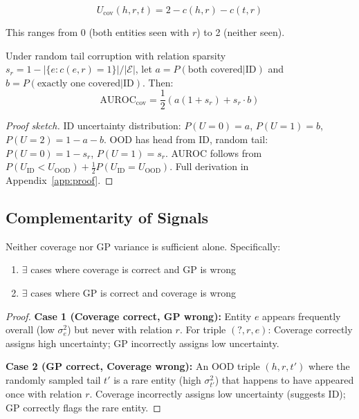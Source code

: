 \begin{definition}
\begin{equation}
    U_{\text{cov}}(h, r, t) = 2 - c(h, r) - c(t, r)
\end{equation}
\end{definition}

This ranges from 0 (both entities seen with $r$) to 2 (neither seen).

\begin{theorem}
\label{thm:coverage_auroc}
Under random tail corruption with relation sparsity $s_r = 1 - |\{e : c(e,r)=1\}|/|\mathcal{E}|$, let $a = P(\text{both covered} | \text{ID})$ and $b = P(\text{exactly one covered} | \text{ID})$. Then:
\begin{equation}
    \text{AUROC}_{\text{cov}} = \frac{1}{2}\left(a(1+s_r) + s_r \cdot b\right)
\end{equation}
\end{theorem}

\begin{proof}[Proof sketch]
ID uncertainty distribution: $P(U=0)=a$, $P(U=1)=b$, $P(U=2)=1-a-b$.
OOD has head from ID, random tail: $P(U=0)=1-s_r$, $P(U=1)=s_r$.
AUROC follows from $P(U_{\text{ID}} < U_{\text{OOD}}) + \frac{1}{2}P(U_{\text{ID}} = U_{\text{OOD}})$.
Full derivation in Appendix~\ref{app:proof}.
\end{proof}

\subsection{Complementarity of Signals}

\begin{theorem}[Complementarity]
\label{thm:complementarity}
Neither coverage nor GP variance is sufficient alone. Specifically:
\begin{enumerate}
    \item $\exists$ cases where coverage is correct and GP is wrong
    \item $\exists$ cases where GP is correct and coverage is wrong
\end{enumerate}
\end{theorem}

\begin{proof}
\textbf{Case 1 (Coverage correct, GP wrong):} Entity $e$ appears frequently overall (low $\sigma^2_e$) but never with relation $r$.
For triple $(?, r, e)$: Coverage correctly assigns high uncertainty; GP incorrectly assigns low uncertainty.

\textbf{Case 2 (GP correct, Coverage wrong):} An OOD triple $(h, r, t')$ where the randomly sampled tail $t'$ is a rare entity (high $\sigma^2_{t'}$) that happens to have appeared once with relation $r$.
Coverage incorrectly assigns low uncertainty (suggests ID); GP correctly flags the rare entity.
\end{proof}

